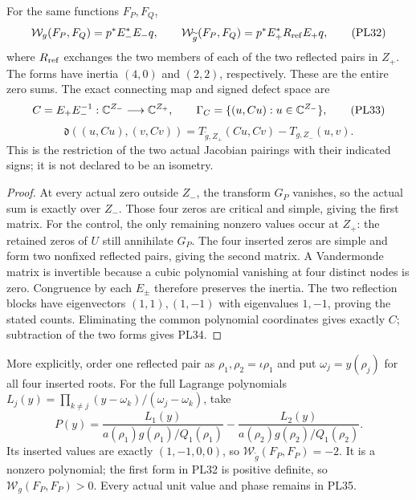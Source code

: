 \begin{theorem}
\label{pl:thm:contrast}
For the same functions \(F_P,F_Q\),
\[
 \mathcal W_g(F_P,F_Q)=p^*E_-^*E_-q,\qquad
 \mathcal W_{\widetilde g}(F_P,F_Q)=p^*E_+^*R_{\rm ref}E_+q,
 \tag{PL32}\label{pl:pl:contrast}
\]
where \(R_{\rm ref}\) exchanges the two members of each of the two
reflected pairs in \(Z_+\). The forms have inertia \((4,0)\) and
\((2,2)\), respectively. These are the entire zero sums.
The exact connecting map and signed defect space are
\[
 C=E_+E_-^{-1}:\mathbb C^{Z_-}\longrightarrow\mathbb C^{Z_+},\qquad
 \Gamma_C=\{(u,Cu):u\in\mathbb C^{Z_-}\},
 \tag{PL33}
\]
\[
 \mathfrak d((u,Cu),(v,Cv))
       =T_{\widetilde g,Z_+}(Cu,Cv)-T_{g,Z_-}(u,v).
 \tag{PL34}\label{pl:pl:paired-defect}
\]
This is the restriction of the two actual Jacobian pairings with
their indicated signs; it is not declared to be an isometry.
\end{theorem}
\begin{proof}
At every actual zero outside \(Z_-\), the transform \(G_P\)
vanishes, so the actual sum is exactly over \(Z_-\).
Those four zeros are critical and simple, giving the first matrix.
For the control, the only remaining nonzero values occur at \(Z_+\):
the retained zeros of \(U\) still annihilate \(G_P\).
The four inserted zeros are simple and form two nonfixed reflected
pairs, giving the second matrix. A Vandermonde matrix is invertible
because a cubic polynomial vanishing at four distinct nodes is zero.
Congruence by each \(E_\pm\) therefore preserves the inertia.
The two reflection blocks have eigenvectors \((1,1),(1,-1)\)
with eigenvalues \(1,-1\), proving the stated counts.
Eliminating the common polynomial coordinates gives exactly \(C\);
subtraction of the two forms gives PL34.
\end{proof}

More explicitly, order one reflected pair as \(\rho_1,\rho_2=\iota\rho_1\)
and put \(\omega_j=y(\rho_j)\) for all four inserted roots.
For the full Lagrange polynomials
\(L_j(y)=\prod_{k\ne j}(y-\omega_k)/(\omega_j-\omega_k)\), take
\[
 P(y)=\frac{L_1(y)}{a(\rho_1)g(\rho_1)/Q_1(\rho_1)}
      -\frac{L_2(y)}{a(\rho_2)g(\rho_2)/Q_1(\rho_2)}.
 \tag{PL35}\label{pl:pl:negative}
\]
Its inserted values are exactly \((1,-1,0,0)\), so
\(\mathcal W_{\widetilde g}(F_P,F_P)=-2\).
It is a nonzero polynomial; the first form in PL32 is positive
definite, so \(\mathcal W_g(F_P,F_P)>0\).
Every actual unit value and phase remains in PL35.

